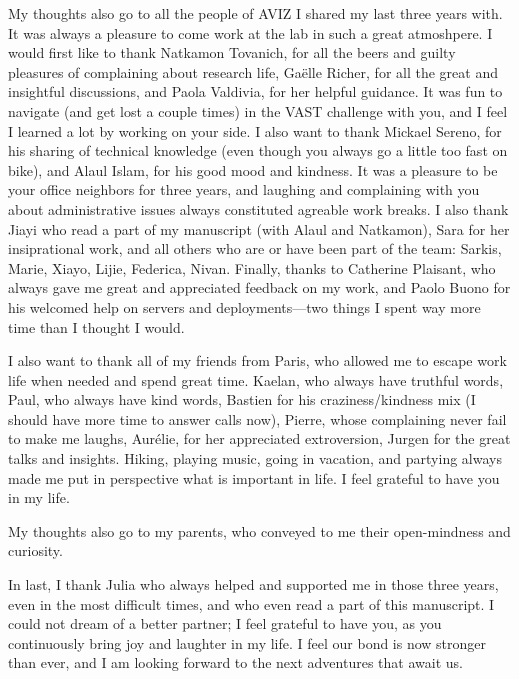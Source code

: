 My thoughts also go to all the people of AVIZ I shared my last three years with. It was always a pleasure to come work at the lab in such a great atmoshpere.
I would first like to thank Natkamon Tovanich, for all the beers and guilty pleasures of complaining about research life, Gaëlle Richer, for all the great and insightful discussions, and Paola Valdivia, for her helpful guidance.
It was fun to navigate (and get lost a couple times) in the VAST challenge with you, and I feel I learned a lot by working on your side.
I also want to thank Mickael Sereno, for his sharing of technical knowledge (even though you always go a little too fast on bike), and Alaul Islam, for his good mood and kindness. It was a pleasure to be your office neighbors for three years, and laughing and complaining with you about administrative issues always constituted agreable work breaks.
I also thank Jiayi who read a part of my manuscript (with Alaul and Natkamon), Sara for her insiprational work, and all others who are or have been part of the team: Sarkis, Marie, Xiayo, Lijie, Federica, Nivan.
Finally, thanks to Catherine Plaisant, who always gave me great and appreciated feedback on my work, and Paolo Buono for his welcomed help on servers and deployments---two things I spent way more time than I thought I would.



I also want to thank all of my friends from Paris, who allowed me to escape work life when needed and spend great time.
Kaelan, who always have truthful words, Paul, who always have kind words, Bastien for his craziness/kindness mix (I should have more time to answer calls now), Pierre, whose complaining never fail to make me laughs, Aurélie, for her appreciated extroversion, Jurgen for the great talks and insights.
Hiking, playing music, going in vacation, and partying always made me put in perspective what is important in life.
I feel grateful to have you in my life.



My thoughts also go to my parents, who conveyed to me their open-mindness and curiosity.



In last, I thank Julia who always helped and supported me in those three years, even in the most difficult times, and who even read a part of this manuscript.
I could not dream of a better partner; I feel grateful to have you, as you continuously bring joy and laughter in my life.
I feel our bond is now stronger than ever, and I am looking forward to the next adventures that await us.










